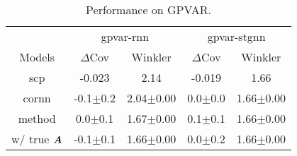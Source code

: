 \vskip -0.1in
\begin{table}[t]
\caption{Performance on GPVAR.}
\label{t:gpvar}
\small
\setlength{\tabcolsep}{3pt}
\setlength{\aboverulesep}{0pt}
\setlength{\belowrulesep}{0pt}
\renewcommand{\arraystretch}{1.2}
\begin{center}
\begin{tabular}{c|c|c c | c c}
 \multicolumn{2}{c|}{} & \multicolumn{2}{c|}{\gls{gpvar}-\gls{rnn}} & \multicolumn{2}{c}{\gls{gpvar}-\gls{stgnn}} \\
  \cmidrule{3-6}
 \multicolumn{2}{c|}{Models} & \multicolumn{1}{c}{$\Delta$Cov} &\multicolumn{1}{c|}{Winkler} & \multicolumn{1}{c}{$\Delta$Cov} &\multicolumn{1}{c}{Winkler} \\
\midrule
\multicolumn{2}{c|}{\gls{scp}} &-0.023 & 2.14 & -0.019 & 1.66 \\
\midrule
\multicolumn{2}{c|}{\gls{cornn}} &-0.1{\tiny$\pm$0.2} & 2.04{\tiny$\pm$0.00}& 0.0{\tiny$\pm$0.0} & 1.66{\tiny$\pm$0.00} \\
\midrule
\multicolumn{2}{c|}{\gls{method}} &0.0{\tiny$\pm$0.1} & 1.67{\tiny$\pm$0.00}&0.1{\tiny$\pm$0.1} & 1.66{\tiny$\pm$0.00}\\
\multicolumn{2}{c|}{w/ true ${\bm{A}}$} &-0.1{\tiny$\pm$0.1} & 1.66{\tiny$\pm$0.00}&0.0{\tiny$\pm$0.2} & 1.66{\tiny$\pm$0.00} \\
\bottomrule
\end{tabular}
\end{center}
\end{table}